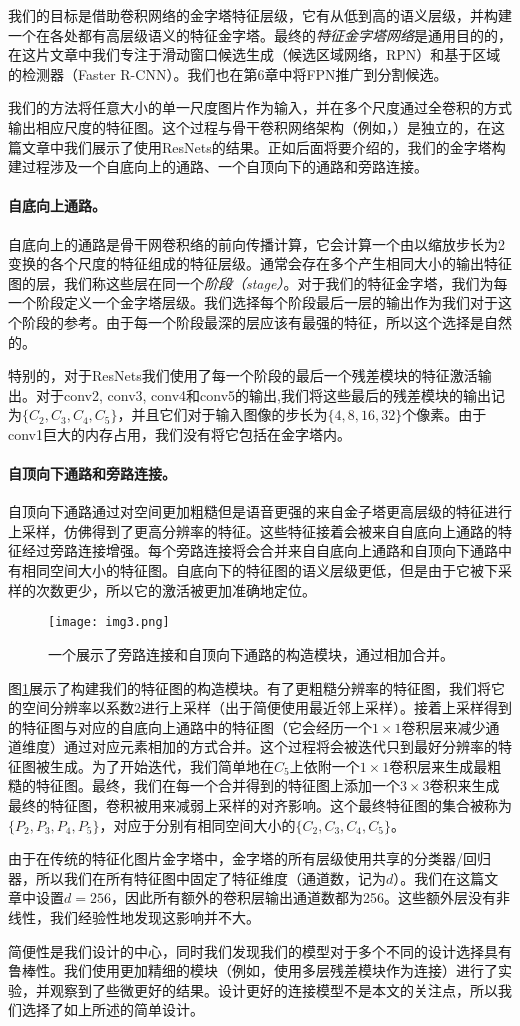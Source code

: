 \documentclass[../main.tex]{subfile}
\begin{document}
我们的目标是借助卷积网络的金字塔特征层级，它有从低到高的语义层级，并构建一个在各处都有高层级语义的特征金字塔。最终的\textit{特征金字塔网络}是通用目的的，在这片文章中我们专注于滑动窗口候选生成（候选区域网络，RPN）和基于区域的检测器（Faster R-CNN）。我们也在第6章中将FPN推广到分割候选。

我们的方法将任意大小的单一尺度图片作为输入，并在多个尺度通过全卷积的方式输出相应尺度的特征图。这个过程与骨干卷积网络架构（例如，\cite{alexnet,vgg,resnet}）是独立的，在这篇文章中我们展示了使用ResNets\cite{resnet}的结果。正如后面将要介绍的，我们的金字塔构建过程涉及一个自底向上的通路、一个自顶向下的通路和旁路连接。

\paragraph{自底向上通路。}自底向上的通路是骨干网卷积络的前向传播计算，它会计算一个由以缩放步长为2变换的各个尺度的特征组成的特征层级。通常会存在多个产生相同大小的输出特征图的层，我们称这些层在同一个\textit{阶段（stage）}。对于我们的特征金字塔，我们为每一个阶段定义一个金字塔层级。我们选择每个阶段最后一层的输出作为我们对于这个阶段的参考。由于每一个阶段最深的层应该有最强的特征，所以这个选择是自然的。

特别的，对于ResNets\cite{resnet}我们使用了每一个阶段的最后一个残差模块的特征激活输出。对于conv2, conv3, conv4和conv5的输出,我们将这些最后的残差模块的输出记为$\{C_2, C_3,C_4,C_5\}$，并且它们对于输入图像的步长为$\{4, 8, 16, 32\}$个像素。由于conv1巨大的内存占用，我们没有将它包括在金字塔内。

\paragraph{自顶向下通路和旁路连接。}自顶向下通路通过对空间更加粗糙但是语音更强的来自金子塔更高层级的特征进行上采样，仿佛得到了更高分辨率的特征。这些特征接着会被来自自底向上通路的特征经过旁路连接增强。每个旁路连接将会合并来自自底向上通路和自顶向下通路中有相同空间大小的特征图。自底向下的特征图的语义层级更低，但是由于它被下采样的次数更少，所以它的激活被更加准确地定位。

\begin{figure}[htb]
    \centering
    \texttt{[image: img3.png]}
    \caption{一个展示了旁路连接和自顶向下通路的构造模块，通过相加合并。}
    \label{fig:img3}
\end{figure}

图\ref{fig:img3}展示了构建我们的特征图的构造模块。有了更粗糙分辨率的特征图，我们将它的空间分辨率以系数2进行上采样（出于简便使用最近邻上采样）。接着上采样得到的特征图与对应的自底向上通路中的特征图（它会经历一个$1\times 1$卷积层来减少通道维度）通过对应元素相加的方式合并。这个过程将会被迭代只到最好分辨率的特征图被生成。为了开始迭代，我们简单地在$C_5$上依附一个$1\times 1$卷积层来生成最粗糙的特征图。最终，我们在每一个合并得到的特征图上添加一个$3\times 3$卷积来生成最终的特征图，卷积被用来减弱上采样的对齐影响。这个最终特征图的集合被称为$\{P_2,P_3,P_4,P_5\}$，对应于分别有相同空间大小的$\{C_2,C_3,C_4, C_5\}$。

由于在传统的特征化图片金字塔中，金字塔的所有层级使用共享的分类器/回归器，所以我们在所有特征图中固定了特征维度（通道数，记为$d$）。我们在这篇文章中设置$d=256$，因此所有额外的卷积层输出通道数都为256。这些额外层没有非线性，我们经验性地发现这影响并不大。

简便性是我们设计的中心，同时我们发现我们的模型对于多个不同的设计选择具有鲁棒性。我们使用更加精细的模块（例如，使用多层残差模块\cite{resnet}作为连接）进行了实验，并观察到了些微更好的结果。设计更好的连接模型不是本文的关注点，所以我们选择了如上所述的简单设计。
\end{document}
